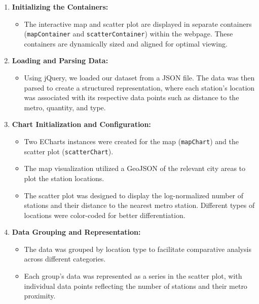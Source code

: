 \begin{enumerate}
    \item \textbf{Initializing the Containers:}
          \begin{itemize}
              \item The interactive map and scatter plot are displayed in separate containers (\texttt{mapContainer} and \texttt{scatterContainer}) within the webpage. These containers are dynamically sized and aligned for optimal viewing.
          \end{itemize}

    \item \textbf{Loading and Parsing Data:}
          \begin{itemize}
              \item Using jQuery, we loaded our dataset from a JSON file. The data was then parsed to create a structured representation, where each station's location was associated with its respective data points such as distance to the metro, quantity, and type.
          \end{itemize}

    \item \textbf{Chart Initialization and Configuration:}
          \begin{itemize}
              \item Two ECharts instances were created for the map (\texttt{mapChart}) and the scatter plot (\texttt{scatterChart}).
              \item The map visualization utilized a GeoJSON of the relevant city areas to plot the station locations.
              \item The scatter plot was designed to display the log-normalized number of stations and their distance to the nearest metro station. Different types of locations were color-coded for better differentiation.
          \end{itemize}

    \item \textbf{Data Grouping and Representation:}
          \begin{itemize}
              \item The data was grouped by location type to facilitate comparative analysis across different categories.
              \item Each group's data was represented as a series in the scatter plot, with individual data points reflecting the number of stations and their metro proximity.
          \end{itemize}


\end{enumerate}
